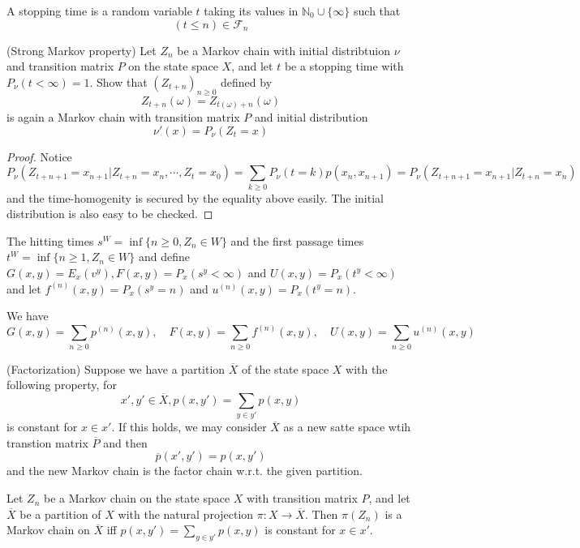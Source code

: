 \documentclass[lang=en, color=blue, ]{elegantbook}
\newcommand{\F}{\mathcal{F}}
\newcommand{\N}{\mathbb{N}}
\begin{document}
\begin{definition}
    A stopping time is a random variable $t$ taking its values in $\N_0 \cup \{\infty\}$ such that
    \[(t\leq n) \in \F_n\]
\end{definition}

\begin{theorem}
    (Strong Markov property) Let $Z_n$ be a Markov chain with initial distribtuion $\nu$ and transition matrix $P$ on the state space $X$, and let $t$ be a stopping time with $P_{\nu}(t<\infty) = 1$. Show that $(Z_{t+n})_{n\geq 0}$ defined by
    \[Z_{t+n}(\omega) = Z_{t(\omega)+n}(\omega)\]
    is again a Markov chain with transition matrix $P$ and initial distribution
    \[
    \nu'(x) = P_{\nu}(Z_t = x)
    \]
\end{theorem}
\begin{proof}
    Notice
    \[
    P_{\nu}(Z_{t+n+1} = x_{n+1}|Z_{t+n} = x_n,\cdots,Z_{t} = x_0 ) = \sum\limits_{k\geq 0} P_{\nu}(t = k)p(x_n,x_{n+1}) = P_{\nu}(Z_{t+n+1} = x_{n+1}|Z_{t+n} = x_n)
    \]
    and the time-homogenity is secured by the equality above easily. The initial distribution is also easy to be checked.
\end{proof}

\begin{definition}
    The hitting times $s^W = \inf\{n\geq 0, Z_n \in W\}$ and the first passage times $t^W = \inf\{n\geq 1, Z_n \in W\}$ and define $G(x,y) = E_x(v^y), F(x,y) = P_x(s^y < \infty)$ and $U(x,y) = P_x(t^y < \infty)$ and let $f^{(n)}(x,y) = P_x(s^y = n)$ and $u^{(n)}(x,y) = P_x(t^y = n)$.\par
    We have
    \[
    G(x,y) = \sum_{n\geq 0}p^{(n)}(x,y),\quad F(x,y) = \sum_{n\geq 0}f^{(n)}(x,y),\quad U(x,y) = \sum_{n\geq 0} u^{(n)}(x,y)
    \]
\end{definition}

\begin{definition}
    (Factorization) Suppose we have a partition $\overline{X}$ of the state space $X$ with the following property, for
    \[
    x', y' \in \overline{X}, p(x,y') = \sum\limits_{y\in y'}p(x,y)
    \]
    is constant for $x\in x'$. If this holds, we may consider $\overline{X}$ as a new satte space wtih transtion matrix $\overline{P}$ and then
    \[
    \overline{p}(x',y') = p(x,y')
    \]
    and the new Markov chain is the factor chain w.r.t. the given partition.
\end{definition}

\begin{theorem}
    Let $Z_n$ be a Markov chain on the state space $X$ with transition matrix $P$, and let $\overline{X}$ be a partition of $X$ with the natural projection $\pi:X\to\overline{X}$. Then $\pi(Z_n)$ is a Markov chain on $\overline{X}$ iff $p(x,y') = \sum\limits_{y\in y'}p(x,y)$ is constant for $x\in x'$.
\end{theorem}
\end{document}
